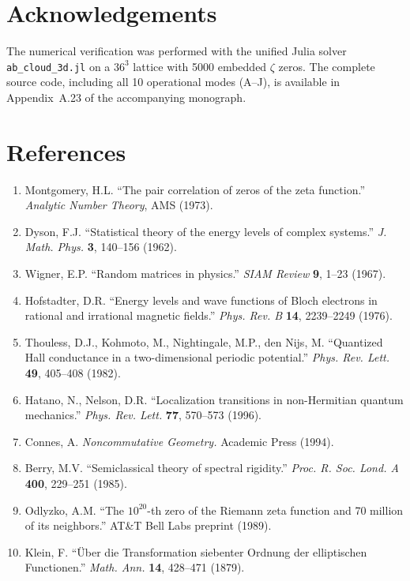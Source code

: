 \documentclass[11pt,a4paper]{article}
\theoremstyle{plain}
\theoremstyle{definition}
\theoremstyle{remark}
\begin{document}
\section*{Acknowledgements}

The numerical verification was performed with the unified Julia solver \texttt{ab\_cloud\_3d.jl} on a $36^3$ lattice with 5000 embedded $\zeta$ zeros. The complete source code, including all 10 operational modes (A--J), is available in Appendix~A.23 of the accompanying monograph.

\section*{References}

{\sloppy
\begin{enumerate}[leftmargin=*,itemsep=1pt]
    \item Montgomery, H.L. ``The pair correlation of zeros of the zeta function.'' \emph{Analytic Number Theory}, AMS (1973).
    \item Dyson, F.J. ``Statistical theory of the energy levels of complex systems.'' \emph{J. Math. Phys.} \textbf{3}, 140--156 (1962).
    \item Wigner, E.P. ``Random matrices in physics.'' \emph{SIAM Review} \textbf{9}, 1--23 (1967).
    \item Hofstadter, D.R. ``Energy levels and wave functions of Bloch electrons in rational and irrational magnetic fields.'' \emph{Phys. Rev. B} \textbf{14}, 2239--2249 (1976).
    \item Thouless, D.J., Kohmoto, M., Nightingale, M.P., den Nijs, M. ``Quantized Hall conductance in a two-dimensional periodic potential.'' \emph{Phys. Rev. Lett.} \textbf{49}, 405--408 (1982).
    \item Hatano, N., Nelson, D.R. ``Localization transitions in non-Hermitian quantum mechanics.'' \emph{Phys. Rev. Lett.} \textbf{77}, 570--573 (1996).
    \item Connes, A. \emph{Noncommutative Geometry.} Academic Press (1994).
    \item Berry, M.V. ``Semiclassical theory of spectral rigidity.'' \emph{Proc. R. Soc. Lond. A} \textbf{400}, 229--251 (1985).
    \item Odlyzko, A.M. ``The $10^{20}$-th zero of the Riemann zeta function and 70 million of its neighbors.'' AT\&T Bell Labs preprint (1989).
    \item Klein, F. ``Über die Transformation siebenter Ordnung der elliptischen Functionen.'' \emph{Math. Ann.} \textbf{14}, 428--471 (1879).

\end{enumerate}}
\end{document}
